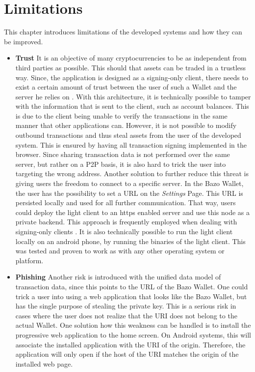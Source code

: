 \section{Limitations}\label{limitations}
This chapter introduces limitations of the developed systems and how they can be improved.
\begin{itemize}
\item \textbf{Trust} 
It is an objective of many cryptocurrencies to be as independent from third parties as possible. This should that assets can be traded in a trustless way. Since, the application is designed as a signing-only client, there needs to exist a certain amount of trust between the user of such a Wallet and the server he relies on \cite{bitcoinclients}. With this architecture, it is technically possible to tamper with the information that is sent to the client, such as account balances. This is due to the client being unable to verify the transactions in the same manner that other applications can. However, it is not possible to modify outbound transactions and thus steal assets from the user of the developed system.
This is ensured by having all transaction signing implemented in the browser. Since sharing transaction data is not performed over the same server, but rather on a P2P basis, it is also hard to trick the user into targeting the wrong address.
Another solution to further reduce this threat is giving users the freedom to connect to a specific server. In the Bazo Wallet, the user has the possibility to set a URL on the \textit{Settings} Page. This URL is persisted locally and used for all further communication. That way, users could deploy the light client to an https enabled server and use this node as a private backend. This approach is frequently employed when dealing with signing-only clients \cite{bitcoinclients}. It is also technically possible to run the light client locally on an android phone, by running the binaries of the light client. This was tested and proven to work as with any other operating system or platform.
\item \textbf{Phishing} 
Another risk is introduced with the unified data model of transaction data, since this points to the URL of the Bazo Wallet. One could trick a user into using a web application that looks like the Bazo Wallet, but has the single purpose of stealing the private key. This is a serious risk in cases where the user does not realize that the URI does not belong to the actual Wallet.
One solution how this weakness can be handled is to install the progressive web application to the home screen. On Android systems, this will associate the installed application with the URI of the origin. Therefore, the application will only open if the host of the URI matches the origin of the installed web page.

\end{itemize}
